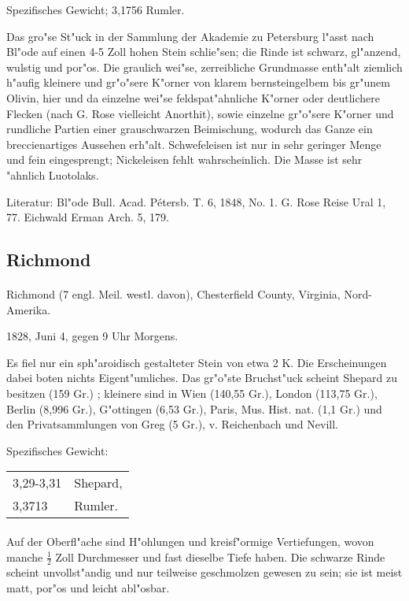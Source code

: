 \documentclass[a4paper, 11pt, oneside]{article}
\begin{document}
Spezifisches Gewicht; 3,1756 Rumler.

Das gro"se St"uck in der Sammlung der Akademie zu Petersburg l"asst nach Bl"ode auf einen 4-5 Zoll hohen Stein schlie"sen; die Rinde ist schwarz, gl"anzend, wulstig und por"os. Die graulich wei"se, zerreibliche Grundmasse enth"alt ziemlich h"aufig kleinere und gr"o"sere K"orner von klarem bernsteingelbem bis gr"unem Olivin, hier und da einzelne wei"se feldspat"ahnliche K"orner oder deutlichere Flecken (nach G. Rose vielleicht Anorthit), sowie einzelne gr"o"sere K"orner und rundliche Partien einer grauschwarzen Beimischung, wodurch das Ganze ein breccienartiges Aussehen erh"alt. Schwefeleisen ist nur in sehr geringer Menge und fein eingesprengt; Nickeleisen fehlt wahrscheinlich. Die Masse ist sehr "ahnlich Luotolaks.

\footnotesize
Literatur: Bl"ode Bull. Acad. Pétersb. T. 6, 1848, No. 1. G. Rose Reise Ural 1, 77. Eichwald Erman Arch. 5, 179.

\subsection{Richmond}
\normalsize
\paragraph{}
Richmond (7 engl. Meil. westl. davon), Chesterfield County, Virginia, Nord-Amerika.

1828, Juni 4, gegen 9 Uhr Morgens.

Es fiel nur ein sph"aroidisch gestalteter Stein von etwa 2 K. Die Erscheinungen dabei boten nichts Eigent"umliches. Das gr"o"ste Bruchst"uck scheint Shepard zu besitzen (159 Gr.) ; kleinere sind in Wien (140,55 Gr.), London (113,75 Gr.), Berlin (8,996 Gr.), G"ottingen (6,53 Gr.), Paris, Mus. Hist. nat. (1,1 Gr.) und den Privatsammlungen von Greg (5 Gr.), v. Reichenbach und Nevill.

Spezifisches Gewicht: 
\begin{table}[!ht]
    \centering
    \begin{tabular}{l l}
        3,29-3,31 & Shepard,\\
        3,3713 & Rumler.
    \end{tabular}
\end{table}
\paragraph{}
Auf der Oberfl"ache sind H"ohlungen und kreisf"ormige Vertiefungen, wovon manche $\frac{1}{2}$ Zoll Durchmesser und fast dieselbe Tiefe haben. Die schwarze Rinde scheint unvollst"andig und nur teilweise geschmolzen gewesen zu sein; sie ist meist matt, por"os und leicht abl"osbar.
\end{document}
